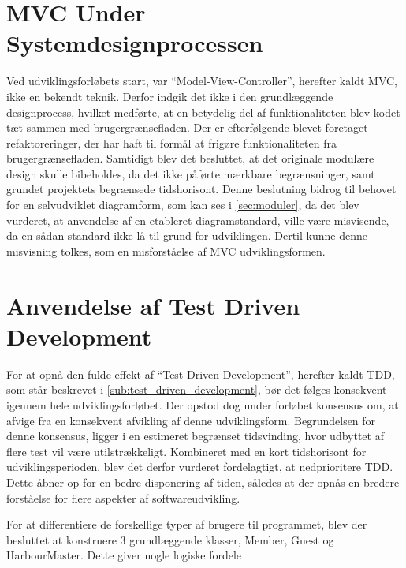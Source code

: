 \section{MVC Under Systemdesignprocessen}

Ved udviklingsforløbets start, var \enquote{Model-View-Controller}, herefter kaldt MVC, ikke en bekendt teknik. Derfor indgik det ikke i den grundlæggende designprocess, hvilket medførte, at en betydelig del af funktionaliteten blev kodet tæt sammen med brugergrænsefladen. Der er efterfølgende blevet foretaget refaktoreringer, der har haft til formål at frigøre funktionaliteten fra brugergrænsefladen. Samtidigt blev det besluttet, at det originale modulære design skulle bibeholdes, da det ikke påførte mærkbare begrænsninger, samt grundet projektets begrænsede tidshorisont. Denne beslutning bidrog til behovet for en selvudviklet diagramform, som kan ses i \cref{sec:moduler}, da det blev vurderet, at anvendelse af en etableret diagramstandard, ville være misvisende, da en sådan standard ikke lå til grund for udviklingen. Dertil kunne denne misvisning tolkes, som en misforståelse af MVC udviklingsformen.

\section{Anvendelse af Test Driven Development}

For at opnå den fulde effekt af \enquote{Test Driven Development}, herefter kaldt TDD, som står beskrevet i \cref{sub:test_driven_development}, bør det følges konsekvent igennem hele udviklingsforløbet. Der opstod dog under forløbet konsensus om, at afvige fra en konsekvent afvikling af denne udviklingsform. Begrundelsen for denne konsensus, ligger i en estimeret begrænset tidsvinding, hvor udbyttet af flere test vil være utilstrækkeligt. Kombineret med en kort tidshorisont for udviklingsperioden, blev det derfor vurderet fordelagtigt, at nedprioritere TDD. Dette åbner op for en bedre disponering af tiden, således at der opnås en bredere forståelse for flere aspekter af softwareudvikling.


For at differentiere de forskellige typer af brugere til programmet, blev der besluttet at konstruere 3 grundlæggende klasser, Member, Guest og HarbourMaster. Dette giver nogle logiske fordele
